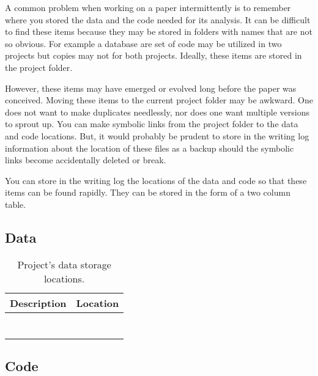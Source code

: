

A common problem when working on a paper intermittently is to remember where you stored the data and the code needed for its analysis.
It can be difficult to find these items because they may be stored in folders with names that are not so obvious.
For example a database are set of code may be utilized in two projects but copies may not for both projects.
Ideally, these items are stored in the project folder.

However, these items may have emerged or evolved long before the paper was conceived. 
Moving these items to the current project folder may be awkward.
One does not want to make duplicates needlessly, nor does one want multiple versions to sprout up.
You can make symbolic links from the project folder to the data and code locations. 
But, it would probably be prudent to store in the writing log information about the location of these files as a backup should the symbolic links become accidentally deleted or break.

You can store in the writing log the locations of the data and code so that these items can be found rapidly.
They can be stored in the form of a two column table.

\subsection*{Data}

\begin{table}
    \centering
    \begin{tabular}{cc}
        Description & Location\\
        \toprule
         & \\
         & \\
         & \\
         & \\
         & \\
         & \\
         & \\
         \bottomrule
    \end{tabular}
    \caption{Project's data storage locations.}
    \label{tab:my_label}
\end{table}



\subsection*{Code}


